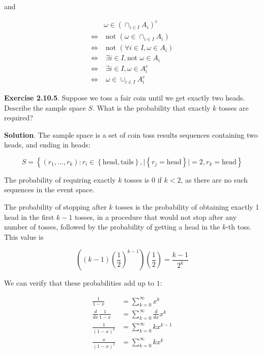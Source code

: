 and

\begin{align*}
& \omega \in \left( \cap_{i \in I} A_{i} \right)^{c}  \\
\Longleftrightarrow
&\; \text{not }\left( \omega \in \cap_{i \in I} A_{i}  \right) 
\\
\Longleftrightarrow
&\; \text{not } \left( \forall i \in I, \omega \in A_{i} \right) 
\\
\Longleftrightarrow
&\; \exists i \in I, \text{not } \omega \in A_{i} 
\\
\Longleftrightarrow
&\; \exists i \in I, \omega \in A_{i}^{c} 
\\
\Longleftrightarrow
&\; \omega \in \cup_{i \in I} A_{i}^{c} 
\end{align*}

\textbf{Exercise 2.10.5}. Suppose we toss a fair coin until we get exactly two heads. Describe the sample space \(S\). What is the probability that exactly \(k\) tosses are required?

\textbf{Solution}. The sample space is a set of coin toss results sequences containing two heads, and ending in heads:

\[
S = \left\{ (r_{1}, \dots, r_{k}) : r_{i} \in \left\{ \text{head}, \text{tails} \right\} , 
\Big| \left\{ r_{j} = \text{head} \right\} \Big|= 2, r_{k} = \text{head} \right\} 
\]

The probability of requiring exactly \(k\) tosses is 0 if \(k < 2\), as there are no such sequences in the event space.

The probability of stopping after \(k\) tosses is the probability of obtaining exactly 1 head in the first \(k - 1\) tosses, in a procedure that would not stop after any number of tosses, followed by the probability of getting a head in the \(k\)-th toss. This value is

\[
\left((k-1) \left(\frac{1}{2}\right)^{k - 1} \right) \left(\frac{1}{2}\right) 
= \frac{k - 1}{2^{k}}
\]

We can verify that these probabilities add up to $1$:

\begin{align*}
\frac{1}{1 - x} 
&= \sum_{k = 0}^{\infty} x^{k} 
\\
\frac{d}{dx} \frac{1}{1 - x} 
&= \sum_{k = 0}^{\infty} \frac{d}{dx} x^{k} 
\\
\frac{1}{(1 - x)^{2}} 
&= \sum_{k = 0}^{\infty} k x^{k - 1} 
\\
\frac{x}{(1 - x)^{2}} 
&= \sum_{k = 0}^{\infty} k x^{k} 
\end{align*}

